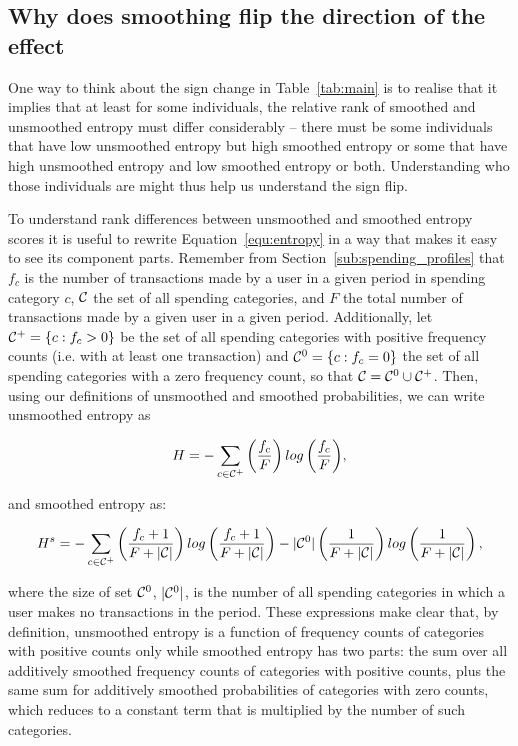 \subsection{Why does smoothing flip the direction of the effect}%
\label{sub:why_does_smoothing_flip_the_direction_of_the_effect}

One way to think about the sign change in Table~\ref{tab:main} is to realise
that it implies that at least for some individuals, the relative rank of
smoothed and unsmoothed entropy must differ considerably -- there must be some
individuals that have low unsmoothed entropy but high smoothed entropy or some
that have high unsmoothed entropy and low smoothed entropy or both.
Understanding who those individuals are might thus help us understand the sign
flip.

To understand rank differences between unsmoothed and smoothed entropy scores
it is useful to rewrite Equation~\ref{equ:entropy} in a way that makes it easy
to see its component parts. Remember from Section~\ref{sub:spending_profiles}
that $f_c$ is the number of transactions made by a user in a given period in
spending category $c$, $\mathcal{C}$ the set of all spending categories, and $F$ the
total number of transactions made by a given user in a given period.
Additionally, let $\mathcal{C}^{+} = \{c: f_c > 0\}$ be the set of all spending
categories with positive frequency counts (i.e.  with at least one transaction)
and $\mathcal{C}^{0} = \{c: f_c = 0\}$ the set of all spending categories with a zero
frequency count, so that $\mathcal{C} = \mathcal{C}^{0} \cup \mathcal{C}^{+}$. Then, using our
definitions of unsmoothed and smoothed probabilities, we can write unsmoothed
entropy as

\begin{equation}
\label{equ:entropy_us}
H = -\sum_{c \in \mathcal{C}^{+}}{\left(\frac{f_c}{F}\right)
log\left(\frac{f_c}{F}\right)},
\end{equation}

\noindent and smoothed entropy as:

\begin{equation}
\label{equ:entropy_s}
H^s = -\sum_{c \in \mathcal{C}^{+}}{\left(\frac{f_c + 1}{F + |\mathcal{C}|}\right)
log\left(\frac{f_c + 1}{F + |\mathcal{C}|}\right)}
- |\mathcal{C}^{0}|\left(\frac{1}{F + |\mathcal{C}|}\right)
log\left(\frac{1}{F + |\mathcal{C}|}\right),
\end{equation}

\noindent where the size of set $\mathcal{C}^{0}$, $|\mathcal{C}^{0}|$, is the number of all
spending categories in which a user makes no transactions in the period.
These expressions make clear that, by definition, unsmoothed entropy is a
function of frequency counts of categories with positive counts only while
smoothed entropy has two parts: the sum over all additively smoothed frequency
counts of categories with positive counts, plus the same sum for additively
smoothed probabilities of categories with zero counts, which reduces to a
constant term that is multiplied by the number of such categories.

